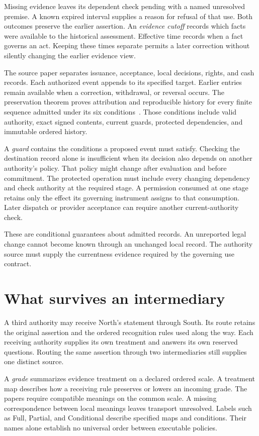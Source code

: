 \documentclass{momentum}
\begin{document}
Missing evidence leaves its dependent check pending with a named unresolved premise.
A known expired interval supplies a reason for refusal of that use.
Both outcomes preserve the earlier assertion.
An \emph{evidence cutoff} records which facts were available to the historical assessment.
Effective time records when a fact governs an act.
Keeping these times separate permits a later correction without silently changing the earlier evidence view.

The source paper separates issuance, acceptance, local decisions, rights, and cash records.
Each authorized event appends to its specified target.
Earlier entries remain available when a correction, withdrawal, or reversal occurs.
The preservation theorem proves attribution and reproducible history for every finite sequence admitted under its six conditions~\cite[Section~3, Theorem~3.1]{sjn}.
Those conditions include valid authority, exact signed contents, current guards, protected dependencies, and immutable ordered history.

A \emph{guard} contains the conditions a proposed event must satisfy.
Checking the destination record alone is insufficient when its decision also depends on another authority's policy.
That policy might change after evaluation and before commitment.
The protected operation must include every changing dependency and check authority at the required stage.
A permission consumed at one stage retains only the effect its governing instrument assigns to that consumption.
Later dispatch or provider acceptance can require another current-authority check.

These are conditional guarantees about admitted records.
An unreported legal change cannot become known through an unchanged local record.
The authority source must supply the currentness evidence required by the governing use contract.

\section{What survives an intermediary}
\label{sec:routes}

A third authority may receive North's statement through South.
Its route retains the original assertion and the ordered recognition rules used along the way.
Each receiving authority supplies its own treatment and answers its own reserved questions.
Routing the same assertion through two intermediaries still supplies one distinct source.

A \emph{grade} summarizes evidence treatment on a declared ordered scale.
A treatment map describes how a receiving rule preserves or lowers an incoming grade.
The papers require compatible meanings on the common scale.
A missing correspondence between local meanings leaves transport unresolved.
Labels such as Full, Partial, and Conditional describe specified maps and conditions.
Their names alone establish no universal order between executable policies.
\end{document}
